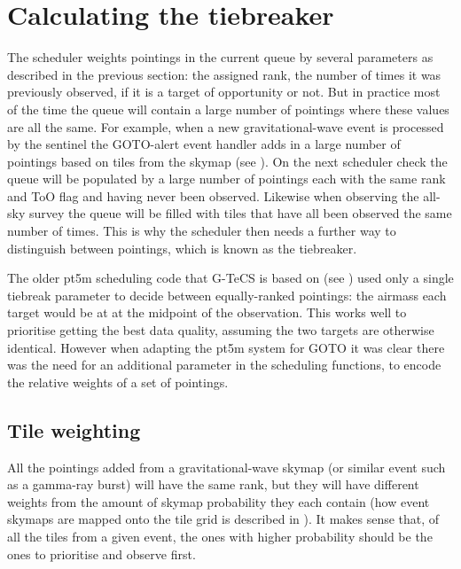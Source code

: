 
\newpage
\section{Calculating the tiebreaker}
\label{sec:scheduler_tiebreaker}
\begin{colsection}


\begin{colsection}

The scheduler weights pointings in the current queue by several parameters as described in the previous section: the assigned rank, the number of times it was previously observed, if it is a target of opportunity or not. But in practice most of the time the queue will contain a large number of pointings where these values are all the same. For example, when a new gravitational-wave event is processed by the sentinel the GOTO-alert event handler adds in a large number of pointings based on tiles from the skymap (see ). On the next scheduler check the queue will be populated by a large number of pointings each with the same rank and ToO flag and having never been observed. Likewise when observing the all-sky survey the queue will be filled with tiles that have all been observed the same number of times. This is why the scheduler then needs a further way to distinguish between pointings, which is known as the tiebreaker.

The older pt5m scheduling code that G-TeCS is based on (see ) used only a single tiebreak parameter to decide between equally-ranked pointings: the airmass each target would be at at the midpoint of the observation. This works well to prioritise getting the best data quality, assuming the two targets are otherwise identical. However when adapting the pt5m system for GOTO it was clear there was the need for an additional parameter in the scheduling functions, to encode the relative weights of a set of pointings.

\end{colsection}

\subsection{Tile weighting}
\label{sec:weights}
\begin{colsection}

 All the pointings added from a gravitational-wave skymap (or similar event such as a gamma-ray burst) will have the same rank, but they will have different weights from the amount of skymap probability they each contain (how event skymaps are mapped onto the tile grid is described in ). It makes sense that, of all the tiles from a given event, the ones with higher probability should be the ones to prioritise and observe first.


\end{colsection}
\end{colsection}
